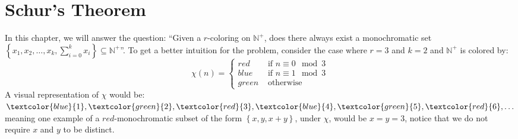 \section{Schur's Theorem}
In this chapter, we will answer the question: ``Given a $r$-coloring on $\mathbb{N}^+$, does there always exist a monochromatic set $\left\{x_1, x_2, \ldots, x_{k}, \sum_{i = 0}^k x_i\right\} \subseteq \mathbb{N}^+$''. To get a better intuition for the problem, consider the case where $r = 3$ and $k = 2$ and $\mathbb{N}^+$ is colored by:
\begin{equation*}
	\chi(n) = \begin{cases} red   & \text{ if } n \equiv 0 \mod 3  \\
              blue  & \text{ if }  n \equiv 1 \mod 3 \\
              green & \text{ otherwise }
	\end{cases}
\end{equation*}
A visual representation of $\chi$ would be: $\textcolor{blue}{1}, \textcolor{green}{2}, \textcolor{red}{3}, \textcolor{blue}{4}, \textcolor{green}{5}, \textcolor{red}{6}, \ldots$ meaning one example of a $red$-monochromatic subset of the form $\left\{x, y, x + y\right\}$, under $\chi$, would be $x = y = 3$, notice that we do not require $x$ and $y$ to be distinct.

